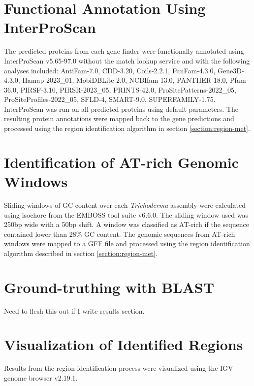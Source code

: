 \section{Functional Annotation Using InterProScan}

The predicted proteins from each gene finder were functionally
annotated using InterProScan
v5.65-97.0\cite{10.1093/bioinformatics/btu031} without the match
lookup service and with the following analyses included: AntiFam-7.0,
CDD-3.20, Coils-2.2.1, FunFam-4.3.0, Gene3D-4.3.0, Hamap-2023\_01,
MobiDBLite-2.0, NCBIfam-13.0, PANTHER-18.0, Pfam-36.0, PIRSF-3.10,
PIRSR-2023\_05, PRINTS-42.0, ProSitePatterns-2022\_05,
ProSiteProfiles-2022\_05, SFLD-4, SMART-9.0,
SUPERFAMILY-1.75. InterProScan was run on all predicted proteins using
default parameters. The resulting protein annotations were mapped back
to the gene predictions and processed using the region identification
algorithm in section \ref{section:region-met}.

\section{Identification of AT-rich Genomic Windows}

Sliding windows of GC content over each \textit{Trichoderma} assembly
were calculated using isochore from the EMBOSS tool suite
v6.6.0\cite{Rice2000}. The sliding window used was 250bp wide with a
50bp shift. A window was classified as AT-rich if the sequence
contained lower than 28\% GC content. The genomic sequences from
AT-rich windows were mapped to a GFF file and processed using the
region identification algorithm described in section
\ref{section:region-met}.

\section{Ground-truthing with BLAST}

Need to flesh this out if I write results section.

\section{Visualization of Identified Regions}

Results from the region identification process were visualized using
the IGV genome browser v2.19.1\cite{Robinson2011}.


